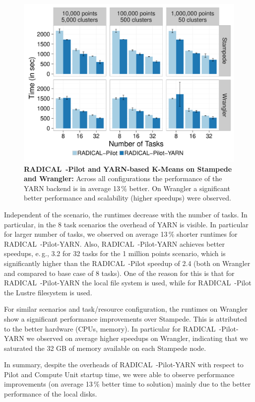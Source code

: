 \begin{figure}[t]
    \centering
    \includegraphics[width=.95\textwidth]{figures/data_analytics_hpc/hpc_hadoop/kmeans.pdf}
    \caption{\textbf{RADICAL~-Pilot and YARN-based K-Means on Stampede and Wrangler:}
        Across all configurations the performance of the YARN backend is in average 13\,\% better.
        On Wrangler a significant better performance and scalability (higher speedups) were observed.}
    \label{fig:experiments_kmeans_rpyarnkmeans}
\end{figure}

Independent of the scenario, the runtimes decrease with the number of tasks.
In particular, in the 8 task scenarios the overhead of YARN is visible.
In particular for larger number of tasks, we observed on average 13\,\% shorter runtimes for RADICAL~-Pilot-YARN.
Also, RADICAL~-Pilot-YARN achieves better speedups, e.\,g., 3.2 for 32 tasks for the 1 million points scenario, which is significantly higher than the RADICAL~-Pilot speedup of 2.4 (both on Wrangler and compared to base case of 8 tasks).
One of the reason for this is that for RADICAL~-Pilot-YARN the local file system is used, while for RADICAL~-Pilot the Lustre filesystem is used.

For similar scenarios and task/resource configuration, the runtimes on Wrangler show a significant performance improvements over Stampede.
This is attributed to the better hardware (CPUs, memory).
In particular for RADICAL~-Pilot-YARN we observed on average higher speedups on Wrangler, indicating that we saturated the 32 GB of memory available on each Stampede node.

In summary, despite the overheads of RADICAL~-Pilot-YARN with respect to Pilot and Compute Unit startup time, we were able to observe performance improvements (on average 13\,\% better time to solution) mainly due to the better performance of the local disks.



